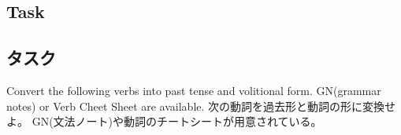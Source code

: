 \documentclass[uplatex,dvipdfmx,b5paper,english,10pt]{jsbook}
\begin{document}
\begin{center}
\end{center}

\ifEnglish
\subsection{Task}
\else
\subsection{タスク}
\fi

\begin{toiquestion}
\ifEnglish
Convert the following verbs into past tense and volitional form.
GN(grammar notes) or Verb Cheet Sheet are available.
\else
次の動詞を過去形と動詞の形に変換せよ。
GN(文法ノート)や動詞のチートシートが用意されている。
\fi
\end{toiquestion}
\end{document}
